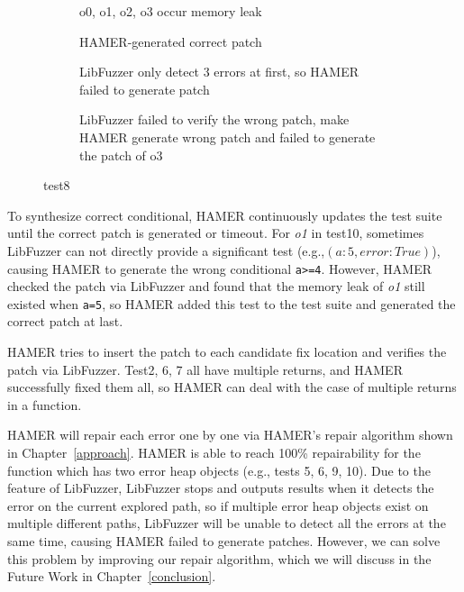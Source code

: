 \documentclass[a4paper,11pt,oneside,openany]{book}
\begin{document}
\begin{figure*}[t]
  \begin{subfigure}{0.5\textwidth}
    
    \caption{o0, o1, o2, o3 occur memory leak}
    \label{test8a}
  \end{subfigure}\hfill
  \begin{subfigure}{0.4\textwidth}
    
    \caption{HAMER-generated correct patch}
    \label{test8b}
  \end{subfigure}
  \begin{subfigure}{0.5\textwidth}
    
    \caption{LibFuzzer only detect 3 errors at first, so HAMER failed to generate patch}
    \label{test8c}
  \end{subfigure}\hfill
  \begin{subfigure}{0.4\textwidth}
    
    \caption{LibFuzzer failed to verify the wrong patch, make HAMER generate wrong patch and failed to generate the patch of o3}
    \label{test8d}
  \end{subfigure}
  \caption{test8} 
  \label{test8}
\end{figure*}


To synthesize correct conditional, HAMER continuously updates the test suite until the correct patch is generated or timeout. For {\it o1} in test10, sometimes LibFuzzer can not directly provide a significant test (e.g.,$(a: 5, error: True)$),  causing HAMER to generate the wrong conditional \verb|a>=4|. However, HAMER checked the patch via LibFuzzer and found that the memory leak of {\it o1} still existed when \verb|a=5|, so HAMER added this test to the test suite and generated the correct patch at last.

HAMER tries to insert the patch to each candidate fix location and verifies the patch via LibFuzzer. Test2, 6, 7 all have multiple returns, and HAMER successfully fixed them all, so HAMER can deal with the case of multiple returns in a function.

HAMER will repair each error one by one via HAMER's repair algorithm shown in Chapter~\ref{approach}. HAMER is able to reach 100\% repairability for the function which has two error heap objects (e.g., tests 5, 6, 9, 10). Due to the feature of LibFuzzer, LibFuzzer stops and outputs results when it detects the error on the current explored path, so if multiple error heap objects exist on multiple different paths, LibFuzzer will be unable to detect all the errors at the same time, causing HAMER failed to generate patches. However, we can solve this problem by improving our repair algorithm, which we will discuss in the Future Work in Chapter~\ref{conclusion}.
\end{document}
